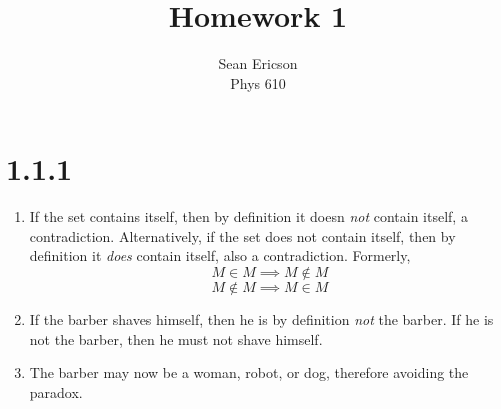 \documentclass[12pt]{article}
\begin{document}
\title{Homework 1}
\author{Sean Ericson \\ Phys 610}
\maketitle

\section*{1.1.1}
\begin{enumerate}[label=(\alph*)]
    \item If the set contains itself, then by definition it doesn \textit{not} contain itself, a contradiction. Alternatively, if the set does not contain itself, then by definition it \textit{does} contain itself, also a contradiction. Formerly,
    \[ M \in M \implies M \notin M \]
    \[M \notin M \implies M \in M \]
    \item If the barber shaves himself, then he is by definition \textit{not} the barber. If he is not the barber, then he must not shave himself. 
    \item The barber may now be a woman, robot, or dog, therefore avoiding the paradox.
\end{enumerate}
\end{document}

